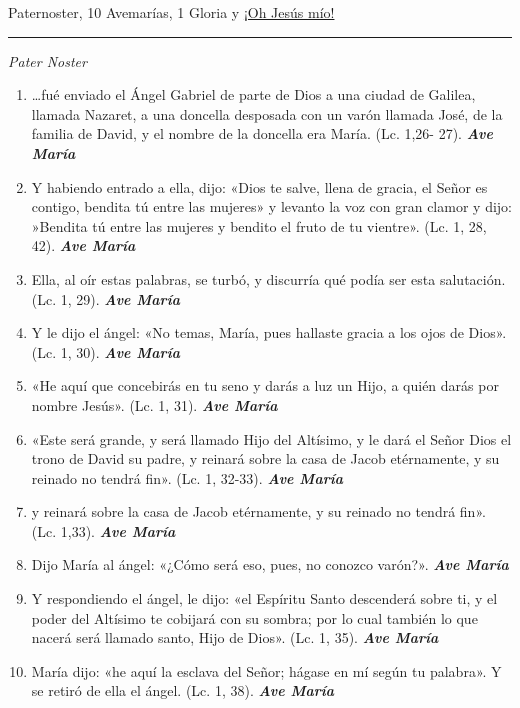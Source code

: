 \documentclass[a4paper,11pt, oneside]{report}
\begin{document}
 Paternoster, 10 Avemarías, 1 Gloria y \hyperlink{finalAnunciacion}{¡Oh Jesús mío!}

\medskip

\begin{center}\rule{1\linewidth}{\linethickness}\end{center}

\medskip

\textit{Pater Noster}
  
\begin{enumerate}
  \item {\ldots}fué enviado el Ángel Gabriel de parte de Dios a una ciudad de Galilea, llamada Nazaret, a una 
  doncella desposada con un varón llamada José, de la familia de David, y el nombre de la doncella era María. (Lc. 1,26- 27). \textbf{\textit{Ave María}}

  \item Y habiendo entrado a ella, dijo: «Dios te salve, llena de gracia, el Señor es contigo, bendita tú entre las mujeres»
  y levanto la voz con gran clamor y dijo: »Bendita tú entre las mujeres y bendito el fruto de tu vientre». (Lc. 1, 28, 42). \textbf{\textit{Ave María}}

  \item Ella, al oír estas palabras, se turbó, y discurría qué podía ser esta salutación. (Lc. 1, 29). \textbf{\textit{Ave María}}

  \item Y le dijo el ángel: «No temas, María, pues hallaste gracia a los ojos de Dios». (Lc. 1, 30). \textbf{\textit{Ave María}}

  \item «He aquí que concebirás en tu seno y darás a luz un Hijo, a quién darás por nombre Jesús». (Lc. 1, 31). \textbf{\textit{Ave María}}

  \item «Este será grande, y será llamado Hijo del Altísimo, y le dará el Señor Dios el trono de David su padre, 
  y reinará sobre la casa de Jacob etérnamente, y su reinado no tendrá fin». (Lc. 1, 32-33). \textbf{\textit{Ave María}}

  \item y reinará sobre la casa de Jacob etérnamente, y su reinado no tendrá fin». (Lc. 1,33). \textbf{\textit{Ave María}}

  \item Dijo María al ángel: «¿Cómo será eso, pues, no conozco varón?». \textbf{\textit{Ave María}}

  \item Y respondiendo el ángel, le dijo: «el Espíritu Santo descenderá sobre ti, 
  y el poder del Altísimo te cobijará con su sombra; por lo cual también lo que nacerá será llamado santo, Hijo de Dios». (Lc. 1, 35). \textbf{\textit{Ave María}}

  \item María dijo: «he aquí la esclava del Señor; hágase en mí según tu palabra». Y se retiró de ella el ángel. (Lc. 1, 38). \textbf{\textit{Ave María}}
\end{enumerate}
      
\end{document}
